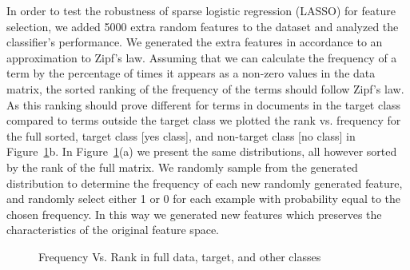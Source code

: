 In order to test the robustness of sparse logistic regression (LASSO) for feature selection, we added 5000 extra random features to the dataset and analyzed the classifier's performance. We generated the extra features in accordance to an approximation to Zipf's law. Assuming that we can calculate the frequency of a term by the percentage of times it appears as a non-zero values in the data matrix, the sorted ranking of the frequency of the terms should follow Zipf's law. As this ranking should prove different for terms in documents in the target class compared to terms outside the target class we plotted the rank vs. frequency for the full sorted, target class [yes class], and non-target class [no class] in Figure~\ref{fig:largecompare}b. In Figure~\ref{fig:largecompare}(a) we present the same distributions, all however sorted by the rank of the full matrix. We randomly sample from the generated distribution to determine the frequency of each new randomly generated feature, and randomly select either 1 or 0 for each example with probability equal to the chosen frequency. In this way we generated new features which preserves the characteristics of the original feature space.

\begin{center}
\begin{figure}[!ht]
\centering
{}
\caption{Frequency Vs. Rank in full data, target, and other classes}
\label{fig:largecompare}
\end{figure}
\end{center}

